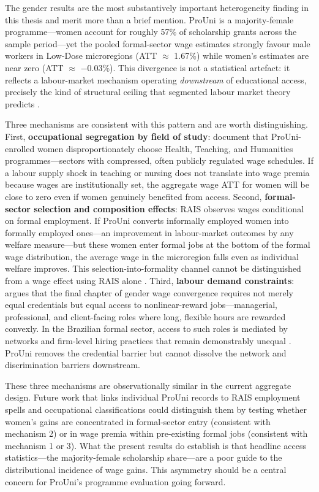 The gender results are the most substantively important heterogeneity finding in this thesis and merit more than a brief mention. ProUni is a majority-female programme---women account for roughly 57\% of scholarship grants across the sample period---yet the pooled formal-sector wage estimates strongly favour male workers in Low-Dose microregions (ATT $\approx$ 1.67\%) while women's estimates are near zero (ATT $\approx$ $-$0.03\%). This divergence is not a statistical artefact: it reflects a labour-market mechanism operating \emph{downstream} of educational access, precisely the kind of structural ceiling that segmented labour market theory predicts \cite{ReichGordonEdwards1973, Goldin2014}.

Three mechanisms are consistent with this pattern and are worth distinguishing. First, \textbf{occupational segregation by field of study}:  document that ProUni-enrolled women disproportionately choose Health, Teaching, and Humanities programmes---sectors with compressed, often publicly regulated wage schedules. If a labour supply shock in teaching or nursing does not translate into wage premia because wages are institutionally set, the aggregate wage ATT for women will be close to zero even if women genuinely benefited from access. Second, \textbf{formal-sector selection and composition effects}: RAIS observes wages conditional on formal employment. If ProUni converts informally employed women into formally employed ones---an improvement in labour-market outcomes by any welfare measure---but these women enter formal jobs at the bottom of the formal wage distribution, the average wage in the microregion falls even as individual welfare improves. This selection-into-formality channel cannot be distinguished from a wage effect using RAIS alone \cite{EngbomEtAl2022}. Third, \textbf{labour demand constraints}:  argues that the final chapter of gender wage convergence requires not merely equal credentials but equal access to nonlinear-reward jobs---managerial, professional, and client-facing roles where long, flexible hours are rewarded convexly. In the Brazilian formal sector, access to such roles is mediated by networks and firm-level hiring practices that remain demonstrably unequal \cite{Gerard2021}. ProUni removes the credential barrier but cannot dissolve the network and discrimination barriers downstream.

These three mechanisms are observationally similar in the current aggregate design. Future work that links individual ProUni records to RAIS employment spells and occupational classifications could distinguish them by testing whether women's gains are concentrated in formal-sector entry (consistent with mechanism 2) or in wage premia within pre-existing formal jobs (consistent with mechanism 1 or 3). What the present results do establish is that headline access statistics---the majority-female scholarship share---are a poor guide to the distributional incidence of wage gains. This asymmetry should be a central concern for ProUni's programme evaluation going forward.

